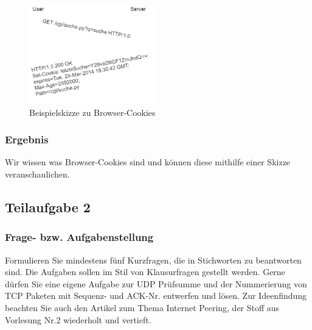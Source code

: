 \begin{figure}[htbp]
\begin{center}
\includegraphics[width=0.5\textwidth]{Bild3}
\caption{Beispielskizze zu Browser-Cookies}
\end{center}
\end{figure}


\subsubsection{Ergebnis}
Wir wissen was Browser-Cookies sind und können diese mithilfe einer Skizze veranschaulichen.

\subsection{Teilaufgabe 2}

\subsubsection{Frage- bzw. Aufgabenstellung}
Formulieren Sie mindestens fünf Kurzfragen, die in Stichworten zu beantworten sind. Die Aufgaben sollen im Stil von Klausurfragen gestellt werden. Gerne dürfen Sie eine eigene Aufgabe zur UDP Prüfsumme und der Nummerierung von TCP Paketen mit Sequenz- und ACK-Nr. entwerfen und lösen. Zur Ideenfindung beachten Sie auch den Artikel zum Thema Internet Peering, der Stoff aus Vorlesung Nr.2 wiederholt und vertieft.

